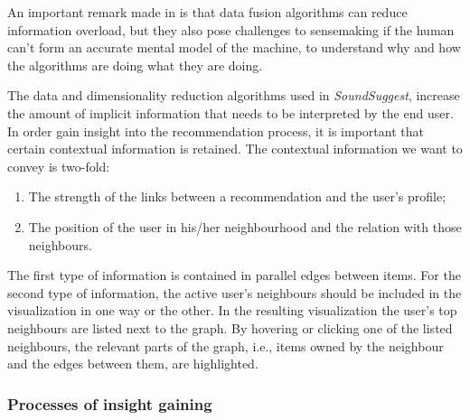 An important remark made in \cite{Klein:2006:MSS:1158821.1159015} is that data fusion algorithms can reduce information overload, but they also pose challenges to sensemaking if the human can't form an accurate mental model of the machine, to understand why and how the algorithms are doing what they are doing.


The data and dimensionality reduction algorithms used in \emph{SoundSuggest}, increase the amount of implicit information that needs to be interpreted by the end user\cite{herman:2000, ware:2004}. In order gain insight into the recommendation process, it is important that certain contextual information is retained. The contextual information we want to convey is two-fold:

\begin{enumerate}
	\item The strength of the links between a recommendation and the user's profile;
	\item The position of the user in his/her neighbourhood and the relation with those neighbours.
\end{enumerate}

The first type of information is contained in parallel edges between items. For the second type of information, the active user's neighbours should be included in the visualization in one way or the other. In the resulting visualization the user's top neighbours are listed next to the graph. By hovering or clicking one of the listed neighbours, the relevant parts of the graph, i.e., items owned by the neighbour and the edges between them, are highlighted.



\subsubsection{Processes of insight gaining}\label{chapter:literature_study:section:user:subsection:insight:subsubsection:processes}

